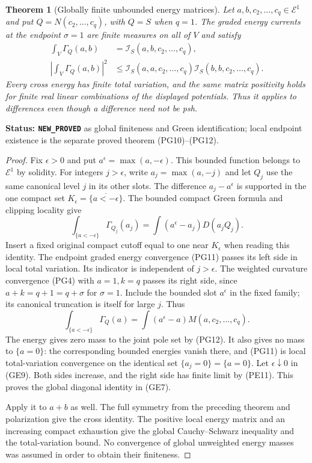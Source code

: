 \documentclass[11pt,a4paper]{article}
\numberwithin{equation}{section}
\newtheorem{theorem}{Theorem}[section]
\theoremstyle{definition}
\theoremstyle{remark}
\begin{document}
\begin{theorem}[Globally finite unbounded energy matrices]
\label{thm:r11-global-first-energy-matrix}
Let $a,b,c_2,\ldots,c_q\in\mathcal E^1$ and put
$Q=N(c_2,\ldots,c_q)$, with $Q=S$ when $q=1$.
The graded energy currents at the endpoint $\sigma=1$ are
finite measures on all of $V$ and satisfy
\[
 \begin{split}
 \int_V\Gamma_Q(a,b)
       &=\mathcal I_S(a,b,c_2,\ldots,c_q),\\
 \left|\int_V\Gamma_Q(a,b)\right|^2
       &\leq\mathcal I_S(a,a,c_2,\ldots,c_q)
                   \mathcal I_S(b,b,c_2,\ldots,c_q).
 \end{split}
 \tag{GE7}
\]
Every cross energy has finite total variation, and the same
matrix positivity holds for finite real linear combinations
of the displayed potentials. Thus it applies to differences
even though a difference need not be psh.
\end{theorem}

\noindent\textbf{Status: \texttt{NEW\_PROVED}} as global
finiteness and Green identification; local endpoint existence
is the separate proved theorem (PG10)--(PG12).

\begin{proof}
Fix $\epsilon>0$ and put $a^\epsilon=\max(a,-\epsilon)$.
This bounded function belongs to $\mathcal E^1$ by solidity.
For integers $j>\epsilon$, write $a_j=\max(a,-j)$ and
let $Q_j$ use the same canonical level $j$ in its other slots.
The difference $a_j-a^\epsilon$ is supported in the one
compact set $K_\epsilon=\overline{\{a<-\epsilon\}}$.
The bounded compact Green formula and clipping locality give
\[
 \int_{\{a<-\epsilon\}}\Gamma_{Q_j}(a_j)
                =\int(a^\epsilon-a_j)D(a_jQ_j).
 \tag{GE8}
\]
Insert a fixed original compact cutoff equal to one near
$K_\epsilon$ when reading this identity. The endpoint graded
energy convergence (PG11) passes its left side in local total
variation. Its indicator is independent of $j>\epsilon$.
The weighted curvature convergence (PG4) with $a=1,k=q$
passes its right side, since $a+k=q+1=q+\sigma$ for
$\sigma=1$. Include the bounded slot $a^\epsilon$ in the
fixed family; its canonical truncation is itself for large $j$.
Thus
\[
 \int_{\{a<-\epsilon\}}\Gamma_Q(a)
           =\int(a^\epsilon-a)M(a,c_2,\ldots,c_q).
 \tag{GE9}
\]
The energy gives zero mass to the joint pole set by (PG12).
It also gives no mass to $\{a=0\}$: the corresponding bounded
energies vanish there, and (PG11) is local total-variation
convergence on the identical set $\{a_j=0\}=\{a=0\}$.
Let $\epsilon\downarrow0$ in (GE9). Both sides increase,
and the right side has finite limit by (PE11). This proves
the global diagonal identity in (GE7).

Apply it to $a+b$ as well. The full symmetry from the
preceding theorem and polarization give the cross identity.
The positive local energy matrix and an increasing compact
exhaustion give the global Cauchy--Schwarz inequality and the
total-variation bound. No convergence of global unweighted
energy masses was assumed in order to obtain their finiteness.
\end{proof}
\end{document}
